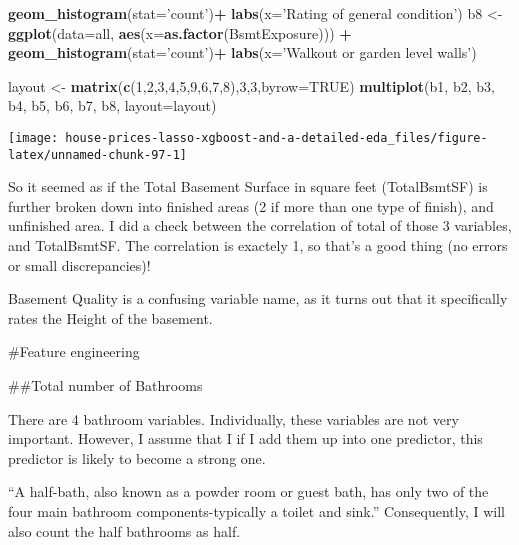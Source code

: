 \documentclass[]{article}
\newenvironment{Shaded}{\begin{snugshade}}{\end{snugshade}}
\newcommand{\DataTypeTok}[1]{\textcolor[rgb]{0.13,0.29,0.53}{#1}}
\newcommand{\DecValTok}[1]{\textcolor[rgb]{0.00,0.00,0.81}{#1}}
\newcommand{\KeywordTok}[1]{\textcolor[rgb]{0.13,0.29,0.53}{\textbf{#1}}}
\newcommand{\NormalTok}[1]{#1}
\newcommand{\OperatorTok}[1]{\textcolor[rgb]{0.81,0.36,0.00}{\textbf{#1}}}
\newcommand{\OtherTok}[1]{\textcolor[rgb]{0.56,0.35,0.01}{#1}}
\newcommand{\StringTok}[1]{\textcolor[rgb]{0.31,0.60,0.02}{#1}}
\begin{document}
\begin{Shaded}
\begin{Highlighting}[]
\StringTok{        }\KeywordTok{geom_histogram}\NormalTok{(}\DataTypeTok{stat=}\StringTok{'count'}\NormalTok{)}\OperatorTok{+}\StringTok{ }\KeywordTok{labs}\NormalTok{(}\DataTypeTok{x=}\StringTok{'Rating of general condition'}\NormalTok{)}
\NormalTok{b8 <-}\StringTok{ }\KeywordTok{ggplot}\NormalTok{(}\DataTypeTok{data=}\NormalTok{all, }\KeywordTok{aes}\NormalTok{(}\DataTypeTok{x=}\KeywordTok{as.factor}\NormalTok{(BsmtExposure))) }\OperatorTok{+}
\StringTok{        }\KeywordTok{geom_histogram}\NormalTok{(}\DataTypeTok{stat=}\StringTok{'count'}\NormalTok{)}\OperatorTok{+}\StringTok{ }\KeywordTok{labs}\NormalTok{(}\DataTypeTok{x=}\StringTok{'Walkout or garden level walls'}\NormalTok{)}

\NormalTok{layout <-}\StringTok{ }\KeywordTok{matrix}\NormalTok{(}\KeywordTok{c}\NormalTok{(}\DecValTok{1}\NormalTok{,}\DecValTok{2}\NormalTok{,}\DecValTok{3}\NormalTok{,}\DecValTok{4}\NormalTok{,}\DecValTok{5}\NormalTok{,}\DecValTok{9}\NormalTok{,}\DecValTok{6}\NormalTok{,}\DecValTok{7}\NormalTok{,}\DecValTok{8}\NormalTok{),}\DecValTok{3}\NormalTok{,}\DecValTok{3}\NormalTok{,}\DataTypeTok{byrow=}\OtherTok{TRUE}\NormalTok{)}
\KeywordTok{multiplot}\NormalTok{(b1, b2, b3, b4, b5, b6, b7, b8, }\DataTypeTok{layout=}\NormalTok{layout)}
\end{Highlighting}
\end{Shaded}

\texttt{[image: house-prices-lasso-xgboost-and-a-detailed-eda\_files/figure-latex/unnamed-chunk-97-1]}

So it seemed as if the Total Basement Surface in square feet
(TotalBsmtSF) is further broken down into finished areas (2 if more than
one type of finish), and unfinished area. I did a check between the
correlation of total of those 3 variables, and TotalBsmtSF. The
correlation is exactely 1, so that's a good thing (no errors or small
discrepancies)!

Basement Quality is a confusing variable name, as it turns out that it
specifically rates the Height of the basement.

\#Feature engineering

\#\#Total number of Bathrooms

There are 4 bathroom variables. Individually, these variables are not
very important. However, I assume that I if I add them up into one
predictor, this predictor is likely to become a strong one.

``A half-bath, also known as a powder room or guest bath, has only two
of the four main bathroom components-typically a toilet and sink.''
Consequently, I will also count the half bathrooms as half.
\end{document}
